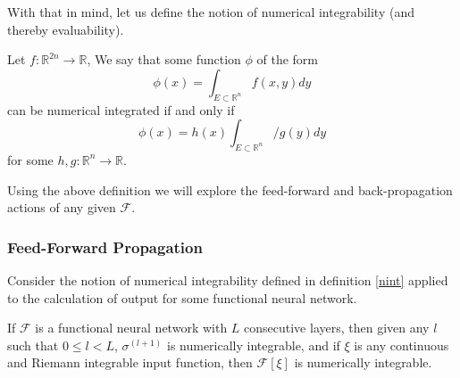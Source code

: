 With that in mind, let us define the notion of numerical integrability (and thereby evaluability).
\begin{definition} \label{nint}
Let $f: \mathbb{R}^{2n}\to\mathbb{R}$, 
We say that some function $\phi$ of the form \begin{equation}\phi(x) = \int_{E\subset\mathbb{R}^n}{f(x,y)dy}\end{equation} can be numerical integrated if and only if
\begin{equation}\phi(x) = h(x)\int_{E\subset\mathbb{R}^n}/{g(y)dy}\end{equation} for some $h,g: \mathbb{R}^{n}\to\mathbb{R}$.
\end{definition}

Using the above definition we will explore the feed-forward and back-propagation actions of any given $\mathcal{F}$.












\subsubsection{Feed-Forward Propagation}

Consider the notion of numerical integrability defined in definition \ref{nint} applied to the calculation of output for some functional neural network.

\begin{theorem}
If $\mathcal{F}$ is a functional neural network with $L$ consecutive layers, then given any $l$ such that $0\leq l <  L$, $\sigma^{(l+1)}$ is numerically integrable, and if $\xi$ is any continuous and Riemann integrable input function, then $\mathcal{F}[\xi]$ is numerically integrable.
\end{theorem}

